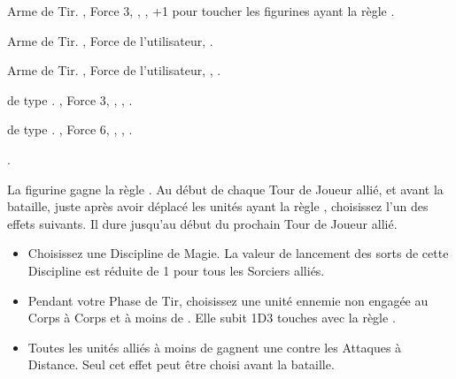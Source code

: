 \closearmyspecialrules






\vspace{1.5cm}
\startarmyarmoury

\startitemlistonecol

\listitemonecol{\blowpipe} Arme de Tir. , Force 3, \poisonedattacks{}, , +1 pour toucher les figurines ayant la règle \largetarget{}.

\listitemonecol{\javelin} Arme de Tir. , Force de l'utilisateur, \quicktofire{}.

\listitemonecol{\poisonedjavelin} Arme de Tir. , Force de l'utilisateur, \poisonedattacks{}, \quicktofire{}.

\listitemonecol{\giantblowpipe} \textbf{\artilleryweapon} de type \textbf{\volleygun}.\newline
{}, Force 3, \poisonedattacks{}, , \quicktofire{}.

\listitemonecol{\greatbow} \textbf{\artilleryweapon} de type \textbf{\boltthrower}.\newline
{}, Force 6, , , \quicktofire{}.

\newpage
\listitemonecol{\engineoftheancients} \oneofakind{}.

La figurine gagne la règle \telepathiclink{}. Au début de chaque Tour de Joueur allié, et avant la bataille, juste après avoir déplacé les unités ayant la règle \vanguard{}, choisissez l'un des effets suivants. Il dure jusqu'au début du prochain Tour de Joueur allié.
\begin{itemize}[label={-}]
	\item Choisissez une Discipline de Magie. La valeur de lancement des sorts de cette Discipline est réduite de 1 pour tous les Sorciers alliés.
	\item Pendant votre Phase de Tir, choisissez une unité ennemie non engagée au Corps à Corps et à moins de . Elle subit 1D3 touches avec la règle \metalshifting{}.
	\item Toutes les unités alliés à moins de  gagnent une  contre les Attaques à Distance. Seul cet effet peut être choisi avant la bataille.
\end{itemize}

\enditemlistonecol

\closearmyarmoury






